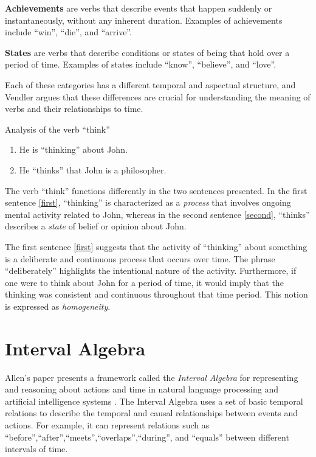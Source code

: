 \textbf{Achievements} are verbs that describe events that happen suddenly or instantaneously, without any inherent duration. Examples of achievements include ``win'', ``die'', and ``arrive''.


\textbf{States} are verbs that describe conditions or states of being that hold over a period of time. Examples of states include ``know'', ``believe'', and ``love''.

Each of these categories has a different temporal and aspectual structure, and Vendler argues that these differences are crucial for understanding the meaning of verbs and their relationships to time.



\begin{exmp} Analysis of the verb ``think''
  \begin{enumerate}
    \item He is ``thinking'' about John. \label{first}
    \item He ``thinks'' that John is a philosopher. \label{second}
  \end{enumerate}

  The verb ``think'' functions differently in the two sentences presented. In the first sentence \ref{first}, ``thinking'' is characterized as a \textit{process} that involves ongoing mental activity related to John, whereas in the second sentence \ref{second}, ``thinks'' describes a \textit{state} of belief or opinion about John.

  The first sentence \ref{first} suggests that the activity of ``thinking'' about something is a deliberate and continuous process that occurs over time. The phrase ``deliberately'' highlights the intentional nature of the activity. Furthermore, if one were to think about John for a period of time, it would imply that the thinking was consistent and continuous throughout that time period. This notion is expressed as \textit{homogeneity}.
\end{exmp}


\section{Interval Algebra}

Allen's paper presents a framework called the \textit{Interval Algebra} for representing and reasoning about actions and time in natural language processing and artificial intelligence systems \cite{allen1984towards}. The Interval Algebra uses a set of basic temporal relations to describe the temporal and causal relationships between events and actions. For example, it can represent relations such as ``before'',``after'',``meets'',``overlaps'',``during'', and ``equals'' between different intervals of time.

